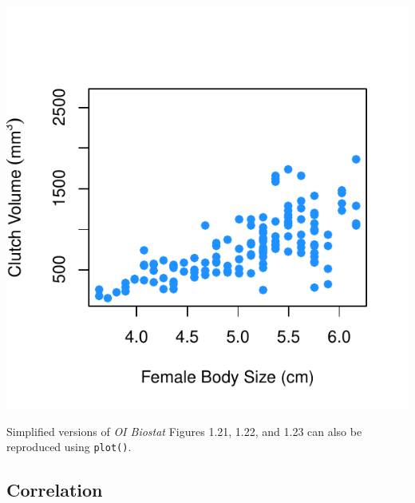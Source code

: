 \begin{centering}
\begin{knitrout}
\color{fgcolor}\begin{kframe}
\begin{alltt}
\hlopt{$}\hlopt{~}\hlopt{$}  \hlstd{=} \hlstd{,}
      \hlstd{=} \hlstd{,}  \hlstd{=} \hlstd{,}  \hlstd{=} \hlstd{(} \hlopt{~} \hlopt{^}\hlstd{)))}
\end{alltt}
\end{kframe}
\includegraphics[width=\maxwidth]{figure/unnamed-chunk-24-1} 

\end{knitrout}
\end{centering}

Simplified versions of \textit{OI Biostat} Figures 1.21, 1.22, and 1.23 can also be reproduced using \texttt{plot()}.

\subsection{Correlation}

